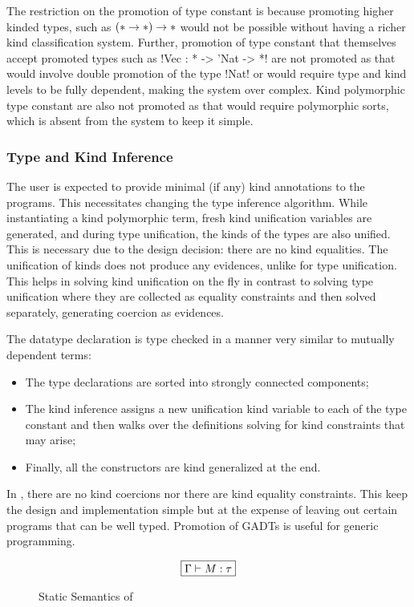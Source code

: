 \documentclass[manuscript,screen,nonacm]{acmart}
\begin{document}
The restriction on the promotion of type constant is because promoting higher kinded types, such as $(\ast \to \ast) \to \ast$ would not be possible without having a richer kind classification system. Further, promotion of type constant that themselves accept promoted types such as !Vec : * -> 'Nat -> *! are not promoted as that would involve double promotion of the type !Nat! or would require type and kind levels to be fully dependent, making the system over complex. Kind polymorphic type constant are also not promoted as that would require polymorphic sorts, which is absent from the system to keep it simple.

\subsubsection{Type and Kind Inference}
The user is expected to provide minimal (if any) kind annotations to the programs. This necessitates changing the type inference algorithm. While instantiating a kind polymorphic term, fresh kind unification variables are generated, and during type unification, the kinds of the types are also unified. This is necessary due to the design decision: there are no kind equalities. The unification of kinds does not produce any evidences, unlike for type unification. This helps in solving kind unification on the fly in contrast to solving type unification where they are collected as equality constraints and then solved separately, generating coercion as evidences.

The datatype declaration is type checked in a manner very similar to mutually dependent terms:
\begin{itemize}
\item The type declarations are sorted into strongly connected components;
\item The kind inference assigns a new unification kind variable to each of the type constant and then walks over the definitions solving for kind constraints that may arise;
\item Finally, all the constructors are kind generalized at the end.
\end{itemize}

In \SFP, there are no kind coercions nor there are kind equality constraints. This keep the design and implementation simple but at the expense of leaving out certain programs that can be well typed. Promotion of GADTs is useful for generic programming.

\begin{figure}[ht]
 \centering
 \begin{gather*}
 \fbox{$\Gamma \vdash M : \tau$}
 \end{gather*}
 \caption{Static Semantics of \SFP}
 \label{fig:sfp-typing}
\end{figure}
\end{document}
